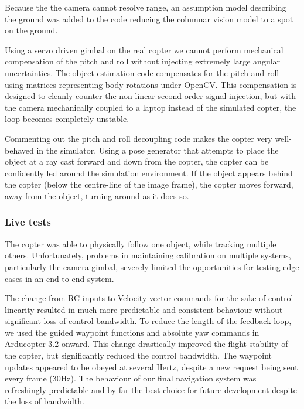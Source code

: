 \documentclass{article}
\newcounter{subsubsubsection}[subsubsection]
\begin{document}
      Because the the camera cannot resolve range, an assumption model describing the ground was added to the code reducing the columnar vision model to a spot on the ground.

      Using a servo driven gimbal on the real copter we cannot perform mechanical compensation of the pitch and roll without injecting extremely large angular uncertainties.
      The object estimation code compensates for the pitch and roll using matrices representing body rotations under OpenCV.
      This compensation is designed to cleanly counter the non-linear second order signal injection, but with the camera mechanically coupled to a laptop instead of the simulated copter, the loop becomes completely unstable.

      Commenting out the pitch and roll decoupling code makes the copter very well-behaved in the simulator.  Using a pose generator that attempts to place the object at a ray cast forward and down from the copter, the copter can be confidently led around the simulation environment.  If the object appears behind the copter (below the centre-line of the image frame), the copter moves forward, away from the object, turning around as it does so.

    \subsubsection{Live tests}
      The copter was able to physically follow one object, while tracking multiple others.  Unfortunately, problems in maintaining calibration on multiple systems, particularly the camera gimbal, severely limited the opportunities for testing edge cases in an end-to-end system.

        The change from RC inputs to Velocity vector commands for the sake of control linearity resulted in much more predictable and consistent behaviour without significant loss of control bandwidth.
        To reduce the length of the feedback loop, we used the guided waypoint functions and absolute yaw commands in Arducopter 3.2 onward.  This change drastically improved the flight stability of the copter, but significantly reduced the control bandwidth.  The waypoint updates appeared to be obeyed at several Hertz, despite a new request being sent every frame (30Hz).
        The behaviour of our final navigation system was refreshingly predictable and by far the best choice for future development despite the loss of bandwidth.
      
\end{document}
